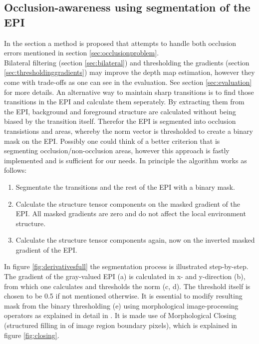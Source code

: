 \documentclass  [
  paper    = a4,
  BCOR     = 10mm,
  twoside,
  fontsize = 12pt,
  fleqn,
  toc      = bibnumbered,
  toc      = listofnumbered,
  numbers  = noendperiod,
  headings = normal,
  listof   = leveldown,
  version  = 3.03
]                                       {scrreprt}
\begin{document}
 \subsection{Occlusion-awareness using segmentation of the EPI}
 \label{sec:occlusionsegmentation}
 In the section a method is proposed that attempts to handle both occlusion errors mentioned in section \ref{sec:occlusionproblem}.\\
 Bilateral filtering (section \ref{sec:bilateral}) and thresholding the gradients (section \ref{sec:thresholdinggradients}) may improve the depth map estimation, however they come with trade-offs as one can see in the evaluation. See section \ref{sec:evaluation} for more details. An alternative way to maintain sharp transitions is to find those transitions in the EPI and calculate them seperately. By extracting them from the EPI, background and foreground structure are calculated without being biased by the transition itself. Therefor the EPI is segmented into occlusion transistions and areas, whereby the norm vector is thresholded to create a binary mask on the EPI. Possibly one could think of a better criterion that is segmenting occlusion/non-occlusion areas, however this approach is fastly implemented and is sufficient for our needs. In principle the algorithm works as follows:
 \begin{enumerate}
 	\item Segmentate the transitions and the rest of the EPI with a binary mask.
 	\item Calculate the structure tensor components on the masked gradient of the EPI. All masked gradients are zero and do not affect the local environment structure.
 	\item Calculate the structure tensor components again, now on the inverted masked gradient of the EPI.
 \end{enumerate}
 In figure \ref{fig:derivativesfull} the segmentation process is illustrated step-by-step. The gradient of the gray-valued EPI (a) is calculated in x- and y-direction (b), from which one calculates and thresholds the norm (c, d). The threshold itself is chosen to be 0.5 if not mentioned otherwise. It is essential to modify resulting mask from the binary thresholding (e)  using morphological image-processing operators as explained in detail in \cite{homepages.inf.ed.ac.uk}. It is made use of Morphological Closing (structured filling in of image region boundary pixels), which is explained in figure \ref{fig:closing}.\\
\end{document}
